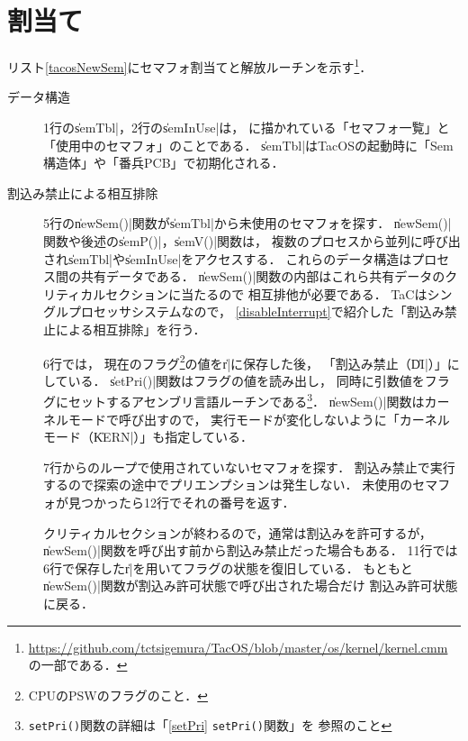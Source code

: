 \section{割当て}
リスト\ref{tacosNewSem}にセマフォ割当てと解放ルーチンを示す\footnote{
  \url{https://github.com/tctsigemura/TacOS/blob/master/os/kernel/kernel.cmm}
  の一部である．}．



\begin{description}
\item [データ構造]
  1行の\|semTbl|，2行の\|semInUse|は，
   に描かれている「セマフォ一覧」と
 「使用中のセマフォ」のことである．
 \|semTbl|はTacOSの起動時に「Sem構造体」や「番兵PCB」で初期化される．

\item [割込み禁止による相互排除]
  5行の\|newSem()|関数が\|semTbl|から未使用のセマフォを探す．
  \|newSem()|関数や後述の\|semP()|，\|semV()|関数は，
  複数のプロセスから並列に呼び出され\|semTbl|や\|semInUse|をアクセスする．
  これらのデータ構造はプロセス間の共有データである．
  \|newSem()|関数の内部はこれら共有データのクリティカルセクションに当たるので
  相互排他が必要である．
  TaCはシングルプロセッサシステムなので，
  \ref{disableInterrupt}で紹介した「割込み禁止による相互排除」を行う．

  6行では，
  現在のフラグ\footnote{CPUのPSWのフラグのこと．}の値を\|r|に保存した後，
  「割込み禁止（\|DI|）」にしている．
  \|setPri()|関数はフラグの値を読み出し，
  同時に引数値をフラグにセットするアセンブリ言語ルーチンである\footnote{
    \texttt{setPri()}関数の詳細は「\ref{setPri} \texttt{setPri()}関数」を
    参照のこと}．
  \|newSem()|関数はカーネルモードで呼び出すので，
  実行モードが変化しないように「カーネルモード（\|KERN|）」も指定している．

  7行からのループで使用されていないセマフォを探す．
  割込み禁止で実行するので探索の途中でプリエンプションは発生しない．
  未使用のセマフォが見つかったら12行でそれの番号を返す．

  クリティカルセクションが終わるので，通常は割込みを許可するが，
  \|newSem()|関数を呼び出す前から割込み禁止だった場合もある．
  11行では6行で保存した\|r|を用いてフラグの状態を復旧している．
  もともと\|newSem()|関数が割込み許可状態で呼び出された場合だけ
  割込み許可状態に戻る．


\end{description}
